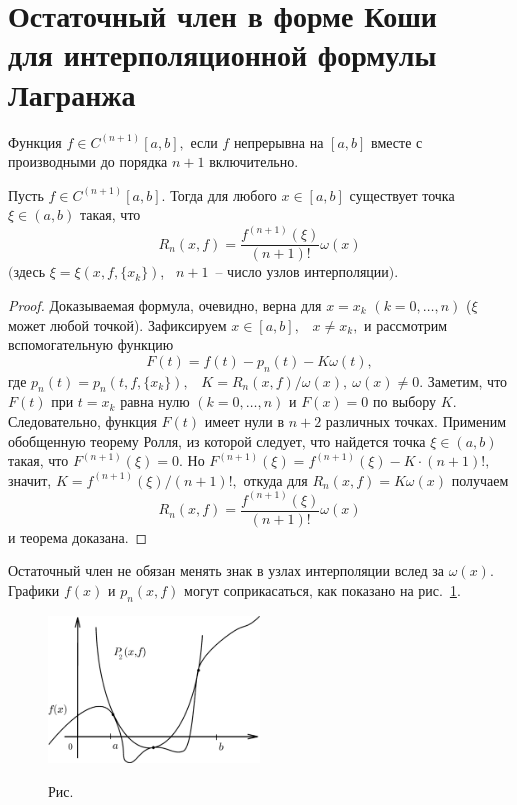 \section{Остаточный член в форме Коши\\
 для интерполяционной формулы Лагранжа}

{Функция $f \in C^{(n+1)}[a,b],$ если $f$ непрерывна на $[a,b]$ вместе с производными
до} {порядка $n+1$ включительно.}

\begin{teo}\label{t1-1}
Пусть $f \in C^{(n+1)}[a,b].$ Тогда для любого $x \in [a,b]$ существует {точка} $\xi
\in (a,b)$ {такая}, что
\[
  R_n(x,f)=\frac{f^{(n+1)}(\xi)}{(n+1)!}\omega (x)
\]
$(${здесь $\xi=\xi(x,f,\{x_k\})$},~ $n+1$~-- число узлов
интерполяции$).$
\end{teo}

\begin{proof}
{Доказываемая формула, очевидно, верна для $x=x_k$}
{$(k=0,\dots ,n)$} ($\xi$ может любой точкой). Зафиксируем {$x \in [a,b],$~ $x \ne x_k,$}
и рассмотрим вспомогательную функцию
\[
  F(t)=f(t)-p_n(t)-K\omega (t),
\]
где {$p_n(t)=p_n(t,f,\{x_k\}),$~ $K=R_n(x,f)/ \omega (x), \ \omega(x) \ne 0.$} Заметим,
что $F(t)$ при $t=x_k$ равна нулю $(k=0,\dots ,n)$ и $F(x)=0$ по выбору $K.$ Следовательно, функция
{$F(t)$} имеет нули в ${n+2}$ различных точках. Применим обобщенную теорему Ролля, из
которой следует, что найдется точка $\xi \in (a,b)$ такая, что $F^{(n+1)}(\xi)=0$.
{Но} $F^{(n+1)}(\xi)=f^{(n+1)}(\xi)-K\cdot (n+1)!,$ значит,
$K=f^{(n+1)}(\xi)/(n+1)!,$ откуда {для} $R_n(x,f)=K\omega(x)$ {получаем}
\[
  R_n(x,f)=\frac{f^{(n+1)}(\xi)}{(n+1)!}\omega (x)
\]
и теорема доказана.
\end{proof}

\begin{Remark}[геометрическое]
{Остаточный} член не обязан менять знак в узлах {интерполяции вслед за
$\omega(x).$} Графики $f(x)$ и $p_n(x,f)$ могут соприкасаться, как показано на
рис.~\ref{r1-4}.
\end{Remark}


\begin{figure}[ht]
\begin{center}
\includegraphics[width=0.5\textwidth]{pict/pict01-4.eps}
\end{center}
 \bigskip
 \label{r1-4}

 \centerline{Рис.~\theris}
 \bigskip
\end{figure}




